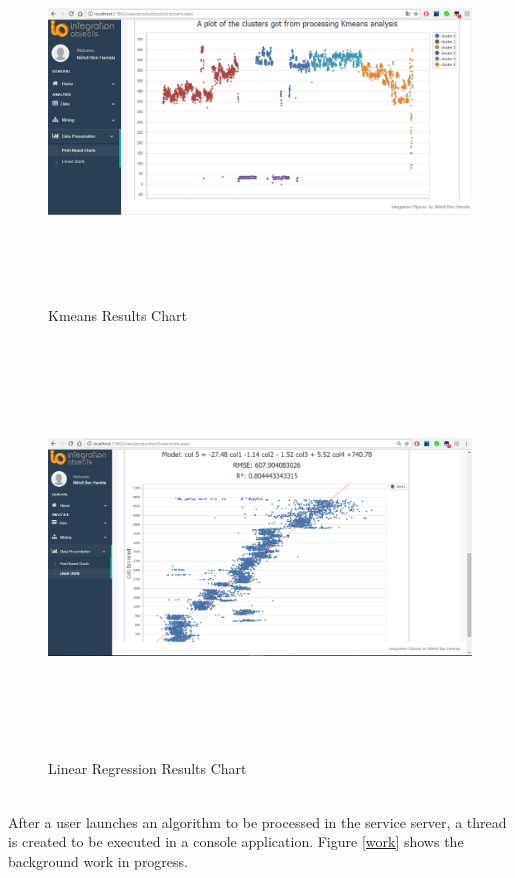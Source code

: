 \begin{figure}[H]
\begin{center}
\includegraphics[width=17cm,height=10cm]{chapter5/kmeans.png}
\end{center}
\caption{Kmeans Results Chart}
\label{chartkmeans}
\end{figure}


\begin{figure}[H]
\begin{center}
\includegraphics[width=17cm,height=11cm]{chapter5/linear.png}
\end{center}
\caption{Linear Regression Results Chart}
\label{chartregression}
\end{figure}
~\\
After a user launches an algorithm to be processed in the service server, a thread is created to be executed in a console application. Figure \ref{work} shows the background work in progress.\\

